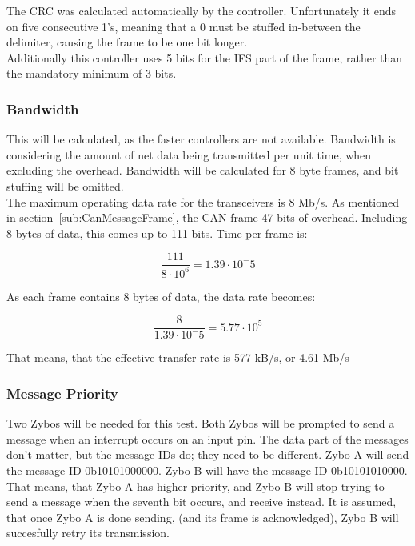 The CRC was calculated automatically by the controller.
Unfortunately it ends on five consecutive 1's, meaning that a 0 must be stuffed in-between the delimiter, causing the frame to be one bit longer.\\

Additionally this controller uses 5 bits for the IFS part of the frame, rather than the mandatory minimum of 3 bits. 



\subsubsection{Bandwidth}\label{sub:CAN_bandwidth}
This will be calculated, as the faster controllers are not available.
Bandwidth is considering the amount of net data being transmitted per unit time, when excluding the overhead.
Bandwidth will be calculated for 8 byte frames, and bit stuffing will be omitted.\\

The maximum operating data rate for the transceivers is 8 Mb/s.
As mentioned in section~\ref{sub:CanMessageFrame}, the CAN frame 47 bits of overhead. 
Including 8 bytes of data, this comes up to 111 bits. 
Time per frame is:

\begin{equation}
\frac{111}{8 \cdot 10^6} = 1.39 \cdot 10^-5
\end{equation}

As each frame contains 8 bytes of data, the data rate becomes:

\begin{equation}
\frac{8}{1.39 \cdot 10^-5}= 5.77 \cdot 10^5
\end{equation}

That means, that the effective transfer rate is 577 kB/s, or 4.61 Mb/s

\subsubsection{Message Priority}\label{sub:CAN_message priority}
Two Zybos will be needed for this test.
Both Zybos will be prompted to send a message when an interrupt occurs on an input pin. 
The data part of the messages don't matter, but the message IDs do; they need to be different.
Zybo A will send the message ID 0b10101000000.
Zybo B will have the message ID 0b10101010000.
That means, that Zybo A has higher priority, and Zybo B will stop trying to send a message when the seventh bit occurs, and receive instead.
It is assumed, that once Zybo A is done sending, (and its frame is acknowledged), Zybo B will succesfully retry its transmission. 
